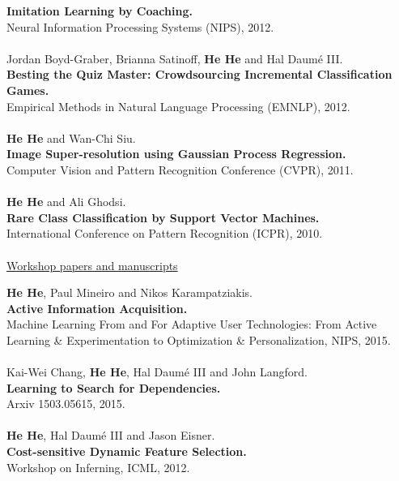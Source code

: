 \documentclass[a4paper,11pt]{article}
\begin{document}
{\bf Imitation Learning by Coaching.}\\ 
Neural Information Processing Systems (NIPS), 2012.\\
\\
Jordan Boyd-Graber, Brianna Satinoff, {\bf He He} and Hal Daum\'e III.\\
{\bf Besting the Quiz Master: Crowdsourcing Incremental Classification Games.}\\
Empirical Methods in Natural Language Processing (EMNLP), 2012.\\
\\
{\bf He He} and Wan-Chi Siu. \\
{\bf Image Super-resolution using Gaussian Process Regression.}\\
Computer Vision and Pattern Recognition Conference (CVPR), 2011.\\
\\
{\bf He He} and Ali Ghodsi. \\
{\bf Rare Class Classification by Support Vector Machines.}\\
International Conference on Pattern Recognition (ICPR), 2010.\\
\\
{\underline{Workshop papers and manuscripts}}

{\bf He He}, Paul Mineiro and Nikos Karampatziakis. \\
{\bf Active Information Acquisition.}\\
Machine Learning From and For Adaptive User Technologies: From Active Learning \& Experimentation to Optimization \& Personalization, NIPS, 2015.\\
\\
Kai-Wei Chang, {\bf He He}, Hal Daum\'e III and John Langford.\\
{\bf Learning to Search for Dependencies.}\\
Arxiv 1503.05615, 2015.\\
\\
{\bf He He}, Hal Daum\'e III and Jason Eisner.\\
{\bf Cost-sensitive Dynamic Feature Selection.}\\
Workshop on Inferning, ICML, 2012.
\end{document}
